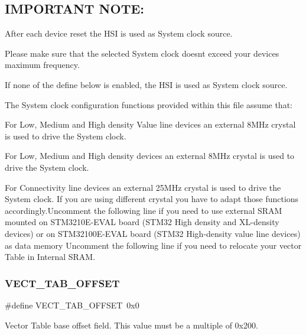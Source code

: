 \subsection*{I\+M\+P\+O\+R\+T\+A\+NT N\+O\+TE\+: }


\begin{DoxyEnumerate}
\item After each device reset the H\+SI is used as System clock source.
\item Please make sure that the selected System clock doesn\textquotesingle{}t exceed your device\textquotesingle{}s maximum frequency.
\item If none of the define below is enabled, the H\+SI is used as System clock source.
\item The System clock configuration functions provided within this file assume that\+:
\begin{DoxyItemize}
\item For Low, Medium and High density Value line devices an external 8M\+Hz crystal is used to drive the System clock.
\item For Low, Medium and High density devices an external 8M\+Hz crystal is used to drive the System clock.
\item For Connectivity line devices an external 25M\+Hz crystal is used to drive the System clock. If you are using different crystal you have to adapt those functions accordingly.\+Uncomment the following line if you need to use external S\+R\+AM mounted on S\+T\+M3210\+E-\/\+E\+V\+AL board (S\+T\+M32 High density and X\+L-\/density devices) or on S\+T\+M32100\+E-\/\+E\+V\+AL board (S\+T\+M32 High-\/density value line devices) as data memory Uncomment the following line if you need to relocate your vector Table in Internal S\+R\+AM. 
\end{DoxyItemize}
\end{DoxyEnumerate}\mbox{\label{group___s_t_m32_f10x___system___private___defines_ga40e1495541cbb4acbe3f1819bd87a9fe}} 
\subsubsection{\texorpdfstring{VECT\_TAB\_OFFSET}{VECT\_TAB\_OFFSET}}
{\footnotesize\ttfamily \#define V\+E\+C\+T\+\_\+\+T\+A\+B\+\_\+\+O\+F\+F\+S\+ET~0x0}

Vector Table base offset field. This value must be a multiple of 0x200. 